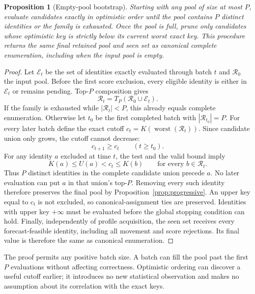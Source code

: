 \documentclass[11pt]{article}
\newtheorem{proposition}{Proposition}
\begin{document}
\begin{proposition}[Empty-pool bootstrap]\label{prop:bootstrap}
Starting with any pool of size at most $P$, evaluate candidates exactly in optimistic order until the pool contains $P$ distinct identities or the family is exhausted. Once the pool is full, prune only candidates whose optimistic key is strictly below its current worst exact key. This procedure returns the same final retained pool and seen set as canonical complete enumeration, including when the input pool is empty.
\end{proposition}
\begin{proof}
Let $\mathcal E_t$ be the set of identities exactly evaluated through batch $t$ and $\mathcal R_0$ the input pool. Before the first score exclusion, every eligible identity is either in $\mathcal E_t$ or remains pending. Top-$P$ composition gives
\begin{equation}
\mathcal R_t=T_P(\mathcal R_0\cup\mathcal E_t).
\end{equation}
If the family is exhausted while $|\mathcal R_t|<P$, this already equals complete enumeration. Otherwise let $t_0$ be the first completed batch with $|\mathcal R_{t_0}|=P$. For every later batch define the exact cutoff $c_t=K(\operatorname{worst}(\mathcal R_t))$. Since candidate union only grows, the cutoff cannot decrease:
\begin{equation}
c_{t+1}\ge c_t\qquad(t\ge t_0).
\end{equation}
For any identity $a$ excluded at time $t$, the test and the valid bound imply
\begin{equation}
K(a)\le U(a)<c_t\le K(b)\qquad\text{for every }b\in\mathcal R_t.
\end{equation}
Thus $P$ distinct identities in the complete candidate union precede $a$. No later evaluation can put $a$ in that union's top-$P$. Removing every such identity therefore preserves the final pool by Proposition~\ref{prop:progressive}. An upper key equal to $c_t$ is not excluded, so canonical-assignment ties are preserved. Identities with upper key $+\infty$ must be evaluated before the global stopping condition can hold. Finally, independently of profile acquisition, the seen set receives every forecast-feasible identity, including all movement and score rejections. Its final value is therefore the same as canonical enumeration.
\end{proof}

The proof permits any positive batch size. A batch can fill the pool past the first $P$ evaluations without affecting correctness. Optimistic ordering can discover a useful cutoff earlier; it introduces no new statistical observation and makes no assumption about its correlation with the exact keys.
\end{document}
